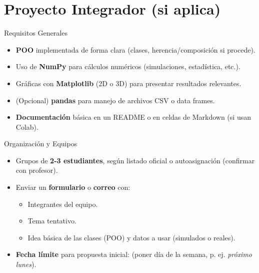 \documentclass[10pt]{beamer}
\begin{document}
\section{Proyecto Integrador (si aplica)}

\begin{frame}{Requisitos Generales}
  \begin{itemize}
    \item \textbf{POO} implementada de forma clara (clases, herencia/composición si procede).
    \item Uso de \textbf{NumPy} para cálculos numéricos (simulaciones, estadística, etc.).
    \item Gráficas con \textbf{Matplotlib} (2D o 3D) para presentar resultados relevantes.
    \item (Opcional) \textbf{pandas} para manejo de archivos CSV o data frames.
    \item \textbf{Documentación} básica en un README o en celdas de Markdown (si usan Colab).
  \end{itemize}
\end{frame}

\begin{frame}{Organización y Equipos}
  \begin{itemize}
    \item Grupos de \textbf{2-3 estudiantes}, según listado oficial o autoasignación (confirmar con profesor).
    \item Enviar un \textbf{formulario} o \textbf{correo} con:
      \begin{itemize}
        \item Integrantes del equipo.
        \item Tema tentativo.
        \item Idea básica de las clases (POO) y datos a usar (simulados o reales).
      \end{itemize}
    \item \textbf{Fecha límite} para propuesta inicial: (poner día de la semana, p. ej. \textit{próximo lunes}).
  \end{itemize}
\end{frame}
\end{document}
